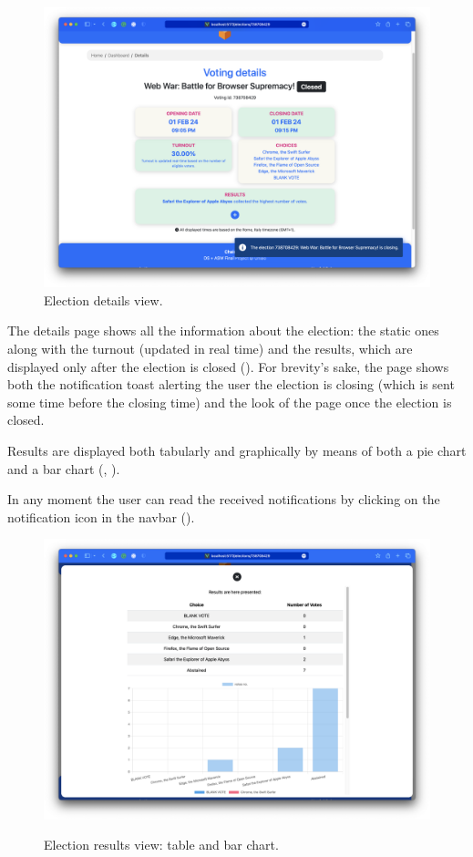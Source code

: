 \documentclass{scrartcl}
\begin{document}
\begin{figure}
    \centering
    \includegraphics[width=0.9\linewidth]{figures/story-board/12-details.png}
    \caption{Election details view.}
    \label{fig:details}
\end{figure}
\restoregeometry

The details page shows all the information about the election: the static ones along with the turnout (updated in real time) and the results, which are displayed only after the election is closed ().
%
For brevity's sake, the page shows both the notification toast alerting the user the election is closing (which is sent some time before the closing time) and the look of the page once the election is closed.

Results are displayed both tabularly and graphically by means of both a pie chart and a bar chart (, ).

In any moment the user can read the received notifications by clicking on the notification icon in the navbar ().

\begin{figure}
    \centering
    \includegraphics[width=0.9\linewidth]{figures/story-board/13-results.png}
    \label{fig:results-1}
    \caption{Election results view: table and bar chart.}
\end{figure}
\end{document}
